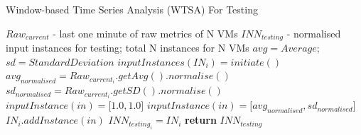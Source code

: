 \begin{algorithm}
\caption{Window-based Time Series Analysis (WTSA) For Testing}
\label{raids_algorithm_pre-processing_2}
\algnewcommand{}
\algnewcommand{}
\algnewcommand{}
\algnewcommand\INPUT{\item[\algorithmicinput]}
\algnewcommand\OUTPUT{\item[\algorithmicoutput]}
\algnewcommand\ABB{\item[\algorithmicabb]}

\begin{algorithmic}[1]
\INPUT $Raw_{current}$ - last one minute of raw metrics of N VMs
\OUTPUT $INN_{testing}$ - normalised input instances for testing; total N instances for N VMs
\ABB 
$avg = Average$; $sd = Standard Deviation$
\Statex
{}
\State $inputInstances(IN_i)=initiate()$
\State $avg_{normalised}=Raw_{current_i}.getAvg().normalise() $
\State $sd_{normalised}=Raw_{current_i}.getSD().normalise() $
\State $inputInstance(in)=\big[1.0,1.0\big]$
\Else
\State $inputInstance(in)=\big[avg_{normalised}, sd_{normalised}\big]$
\EndIf
\State $IN_i.addInstance(in)$
\State $INN_{testing_i} = IN_i $ 
\EndFor
\State \textbf{return} $INN_{testing}$ \newline
\end{algorithmic}
\end{algorithm}

